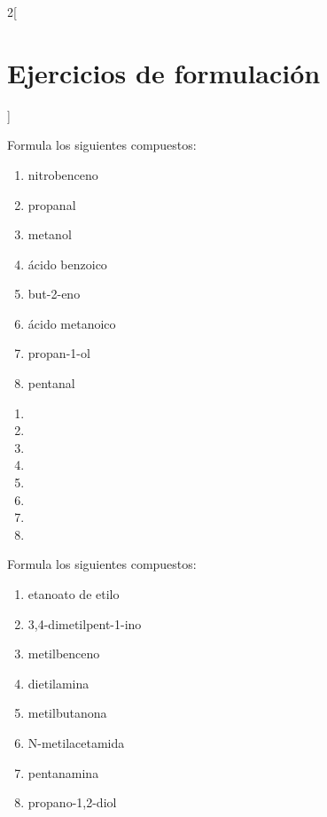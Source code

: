 \documentclass[10pt]{article}
\begin{document}
\begin{multicols}{2}[
  \section{Ejercicios de formulación}
  ]
\begin{exercise}[
    tags    = {orgánica,nomenclatura,múltiple,2B},
    topics  = {química orgánica,formulación,nomenclatura},
    source  = {Química 2B SAN 2016, p392, e23},
  ]
  Formula los siguientes compuestos:

  \begin{enumerate}
    \item nitrobenceno
    \item propanal
    \item metanol
    \item ácido benzoico
    \item but-2-eno
    \item ácido metanoico
    \item propan-1-ol
    \item pentanal
  \end{enumerate}
\end{exercise}

\begin{solution}
  \begin{enumerate}
    \item {}
    \item {}
    \item {}
    \item {}
    \item {}
    \item {}
    \item {}
    \item {}
  \end{enumerate}
\end{solution}



\begin{exercise}[
    tags    = {orgánica,nomenclatura,múltiple,2B},
    topics  = {química orgánica,formulación,nomenclatura},
    source  = {Química 2B SAN 2016, p392, e24},
  ]
  Formula los siguientes compuestos:

  \begin{enumerate}
    \item etanoato de etilo
    \item 3,4-dimetilpent-1-ino
    \item metilbenceno
    \item dietilamina
    \item metilbutanona
    \item N-metilacetamida
    \item pentanamina
    \item propano-1,2-diol
  \end{enumerate}
\end{exercise}


\end{multicols}
\end{document}
